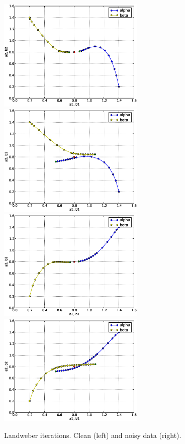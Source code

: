 \begin{figure}
\begin{center}
    \includegraphics[width=7cm]{chapters/schroll/eps/4Dscan3.eps}
    \includegraphics[width=7cm]{chapters/schroll/eps/4Dscan3-5.eps}
    \includegraphics[width=7cm]{chapters/schroll/eps/4Dscan4.eps}
    \includegraphics[width=7cm]{chapters/schroll/eps/4Dscan4-5.eps}
    \end{center}
    \vspace{-0.7cm}
  \caption{Landweber iterations. Clean (left) and noisy data (right). \label{fig3}}
\end{figure}

